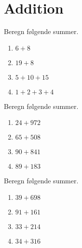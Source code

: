 \documentclass[../main.tex]{subfiles}
\begin{document}
\section{Addition}

\begin{prob}
    Beregn følgende summer.
    \begin{enumerate}[label=\alph*)]
        \item \(\displaystyle 6+8\)
        \vspace{3mm}
        \item \(\displaystyle 19+8\)
        \vspace{3mm}
        \item \(\displaystyle 5+10+15\)
        \vspace{3mm}
        \item \(\displaystyle 1+2+3+4\)
    \end{enumerate}
\end{prob}

\begin{prob}
    Beregn følgende summer.
    \begin{enumerate}[label=\alph*)]
        \item \(\displaystyle 24 + 972\)
        \vspace{3mm}
        \item \(\displaystyle 65 + 508\)
        \vspace{3mm}
        \item \(\displaystyle 90 + 841\)
        \vspace{3mm}
        \item \(\displaystyle 89 + 183\)
    \end{enumerate}
\end{prob}


\begin{prob}
    Beregn følgende summer.
    \begin{enumerate}[label=\alph*)]
        \item \(\displaystyle 39 + 698\)
        \vspace{3mm}
        \item \(\displaystyle 91 + 161\)
        \vspace{3mm}
        \item \(\displaystyle 33 + 214\)
        \vspace{3mm}
        \item \(\displaystyle 34 + 316\)
    \end{enumerate}
\end{prob}
\end{document}
